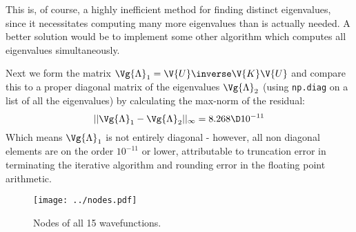 \documentclass[a4paper,10pt]{article}
\begin{document}
	This is, of course, a highly inefficient method for finding distinct eigenvalues, since it necessitates computing many more eigenvalues than is actually needed. A better solution would be to implement some other algorithm which computes all eigenvalues simultaneously.
	
	Next we form the matrix $ \Vg{\Lambda}_1 = \V{U}\inverse \V{K} \V{U} $ and compare this to a proper diagonal matrix of the eigenvalues $ \Vg{\Lambda}_2 $ (using \texttt{np.diag} on a list of all the eigenvalues) by calculating the max-norm of the residual:
	\begin{equation}\label{key}
		|| \Vg{\Lambda}_1 - \Vg{\Lambda}_2 ||_{\infty} = 8.268 \D 10^{-11}
	\end{equation}
	Which means $ \Vg{\Lambda}_1 $ is not entirely diagonal - however, all non diagonal elements are on the order $ 10^{-11} $ or lower, attributable to truncation error in terminating the iterative algorithm and rounding error in the floating point arithmetic.
	
	
	
	
	\begin{figure}[H]
		\centering
		\texttt{[image: ../nodes.pdf]}
		\caption{Nodes of all 15 wavefunctions.}
		\label{fig:nodes}
	\end{figure}
	
	
\end{document}
